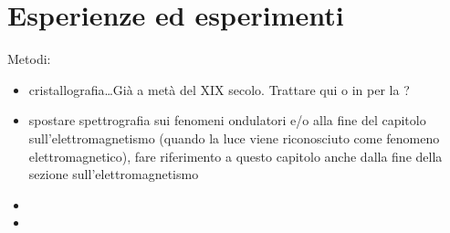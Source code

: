 \documentclass[letterpaper,10pt,italian]{jupyterBook}
\begin{document}
\chapter{Esperienze ed esperimenti}
\label{\detokenize{ch/modern/intro-experiments:esperienze-ed-esperimenti}}\label{\detokenize{ch/modern/intro-experiments:physics-hs-modern-intro-experiences}}\label{\detokenize{ch/modern/intro-experiments::doc}}
\sphinxAtStartPar
Metodi:
\begin{itemize}
\item {} 
\sphinxAtStartPar
cristallografia…Già a metà del XIX secolo. Trattare qui o in {\hyperref[\detokenize{ch/waves/optics:physics-hs-waves-optics}]{}} per la {\hyperref[\detokenize{ch/waves/phenomena:physics-hs-waves-effects-diffraction}]{}}?

\item {} 
\sphinxAtStartPar
spostare spettrografia sui fenomeni ondulatori e/o alla fine del capitolo sull’elettromagnetismo (quando la luce viene riconosciuto come fenomeno elettromagnetico), fare riferimento a questo capitolo anche dalla fine della sezione sull’elettromagnetismo

\item {} 
\sphinxAtStartPar
{} 

\item {} 
\sphinxAtStartPar
{} 

\end{itemize}
\end{document}
